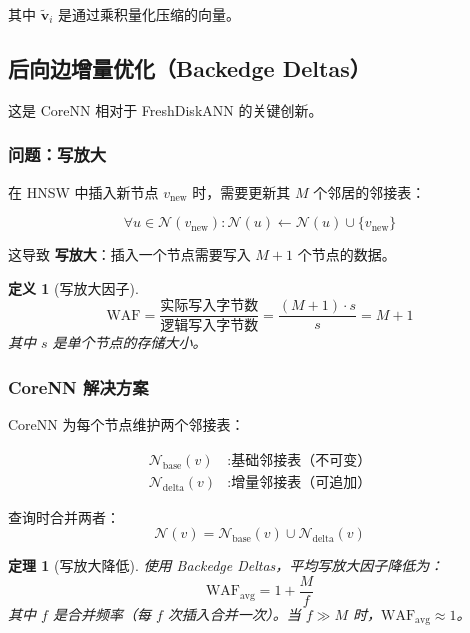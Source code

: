 \documentclass[12pt,a4paper]{article}
\newtheorem{theorem}{定理}[section]
\newtheorem{definition}{定义}[section]
\begin{document}
其中 $\tilde{\mathbf{v}}_i$ 是通过乘积量化压缩的向量。

\subsection{后向边增量优化（Backedge Deltas）}

这是 CoreNN 相对于 FreshDiskANN 的关键创新。

\subsubsection{问题：写放大}

在 HNSW 中插入新节点 $v_{\text{new}}$ 时，需要更新其 $M$ 个邻居的邻接表：

\begin{equation}
\forall u \in \mathcal{N}(v_{\text{new}}): \mathcal{N}(u) \gets \mathcal{N}(u) \cup \{v_{\text{new}}\}
\end{equation}

这导致 \textbf{写放大}：插入一个节点需要写入 $M+1$ 个节点的数据。

\begin{definition}[写放大因子]
\begin{equation}
\text{WAF} = \frac{\text{实际写入字节数}}{\text{逻辑写入字节数}} = \frac{(M+1) \cdot s}{s} = M+1
\end{equation}
其中 $s$ 是单个节点的存储大小。
\end{definition}

\subsubsection{CoreNN 解决方案}

CoreNN 为每个节点维护两个邻接表：

\begin{equation}
\begin{aligned}
\mathcal{N}_{\text{base}}(v) &: \text{基础邻接表（不可变）} \\
\mathcal{N}_{\text{delta}}(v) &: \text{增量邻接表（可追加）}
\end{aligned}
\end{equation}

查询时合并两者：
\begin{equation}
\mathcal{N}(v) = \mathcal{N}_{\text{base}}(v) \cup \mathcal{N}_{\text{delta}}(v)
\end{equation}

\begin{theorem}[写放大降低]
使用 Backedge Deltas，平均写放大因子降低为：
\begin{equation}
\text{WAF}_{\text{avg}} = 1 + \frac{M}{f}
\end{equation}
其中 $f$ 是合并频率（每 $f$ 次插入合并一次）。当 $f \gg M$ 时，$\text{WAF}_{\text{avg}} \approx 1$。
\end{theorem}
\end{document}
